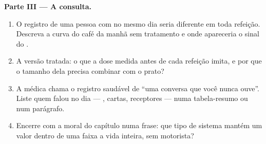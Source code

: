 \begin{problem}
\medskip\noindent\textbf{Parte III --- A consulta.}
\begin{enumerate}[resume]
  \item O registro de uma pessoa com  no mesmo dia seria
        diferente em toda refeição. Descreva a curva do café da manhã
        sem tratamento e onde apareceria o sinal do .
  \item A versão tratada: o que a dose medida antes de cada refeição
        imita, e por que o tamanho dela precisa combinar com o prato?
  \item A médica chama o registro saudável de ``uma conversa que você
        nunca ouve''. Liste quem falou no dia --- , cartas,
        receptores --- numa tabela-resumo ou num parágrafo.
  \item Encerre com a moral do capítulo numa frase: que tipo de
        sistema mantém um valor dentro de uma faixa a vida inteira,
        sem motorista?
\end{enumerate}
\end{problem}
